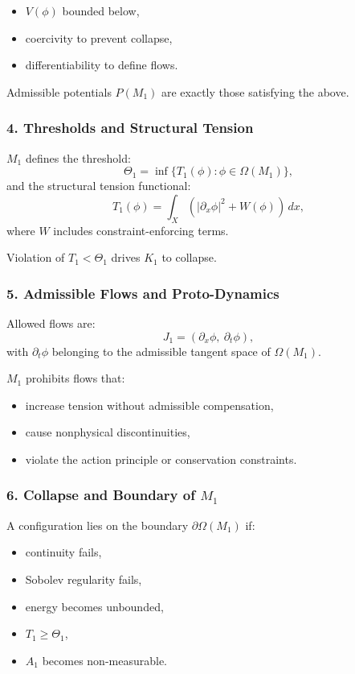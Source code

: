 \begin{itemize}
    \item $V(\phi)$ bounded below,
    \item coercivity to prevent collapse,
    \item differentiability to define flows.
\end{itemize}

Admissible potentials $P(M_1)$ are exactly those satisfying the above.

\subsubsection*{4. Thresholds and Structural Tension}

$M_1$ defines the threshold:
\[
\Theta_1 = \inf \{ T_1(\phi) : \phi \in \Omega(M_1) \},
\]
and the structural tension functional:
\[
T_1(\phi) =
\int_X \left(
|\partial_x \phi|^2 + W(\phi)
\right)\, dx,
\]
where $W$ includes constraint-enforcing terms.

Violation of $T_1 < \Theta_1$ drives $K_1$ to collapse.

\subsubsection*{5. Admissible Flows and Proto-Dynamics}

Allowed flows are:
\[
J_1 = (\partial_x \phi,\ \partial_t \phi),
\]
with $\partial_t\phi$ belonging to the admissible tangent space of $\Omega(M_1)$.

$M_1$ prohibits flows that:
\begin{itemize}
    \item increase tension without admissible compensation,
    \item cause nonphysical discontinuities,
    \item violate the action principle or conservation constraints.
\end{itemize}

\subsubsection*{6. Collapse and Boundary of \texorpdfstring{$M_1$}{M_1}}

A configuration lies on the boundary $\partial\Omega(M_1)$ if:

\begin{itemize}
    \item continuity fails,
    \item Sobolev regularity fails,
    \item energy becomes unbounded,
    \item $T_1 \ge \Theta_1$,
    \item $A_1$ becomes non-measurable.
\end{itemize}

